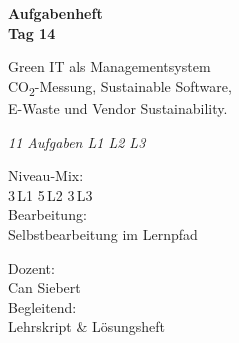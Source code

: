 \documentclass[11pt,a4paper,oneside]{article}
\newcommand{\caveatfontfallback}{\itshape}
\newcommand\caveatfont{\caveatfontfallback}%
\begin{document}
\begin{titlepage}
  \pagestyle{empty}
  \vspace*{1.5cm}
  \\[2pt]
  \noindent{\color{lpAccent}\rule{\linewidth}{1.2pt}}\\[4pt]

  \vspace{3cm}
  {\sffamily\fontsize{30}{34}\selectfont\bfseries\color{lpInk}Aufgabenheft\\Tag 14\par}

  \vspace{0.7cm}
  {\sffamily\large\color{lpGray}Green IT als Managementsystem \textendash{}\\CO\textsubscript{2}-Messung, Sustainable Software,\\E-Waste und Vendor Sustainability.\par}

  \vspace{1.5cm}
  {\caveatfont\LARGE\color{lpAmber}11 Aufgaben \textperiodcentered{} L1 \textperiodcentered{} L2 \textperiodcentered{} L3}\par

  \vfill

  \noindent\begin{minipage}{0.55\linewidth}
    {\sffamily\footnotesize\color{lpGray}Niveau-Mix:}\\
    {\sffamily\small\color{lpInk}3\,\textsf{L1} \textperiodcentered{} 5\,\textsf{L2} \textperiodcentered{} 3\,\textsf{L3}}\\[10pt]
    {\sffamily\footnotesize\color{lpGray}Bearbeitung:}\\
    {\sffamily\small\color{lpInk}Selbstbearbeitung im Lernpfad}
  \end{minipage}\hfill
  \begin{minipage}{0.4\linewidth}
    \raggedleft
    {\sffamily\footnotesize\color{lpGray}Dozent:}\\
    {\sffamily\small\color{lpInk}Can Siebert}\\[10pt]
    {\sffamily\footnotesize\color{lpGray}Begleitend:}\\
    {\sffamily\small\color{lpInk}Lehrskript \& L\"osungsheft}
  \end{minipage}

  \vspace{0.5cm}
  \noindent{\color{lpAccent}\rule{\linewidth}{0.6pt}}
\end{titlepage}
\end{document}
